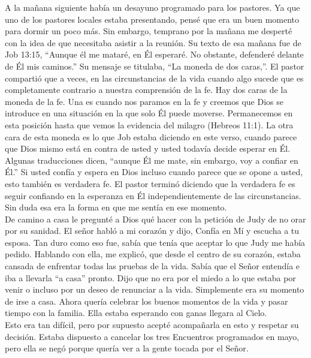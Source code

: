 \documentclass[twoside, 12pt]{book}
\begin{document}
A la mañana siguiente había un desayuno programado para los pastores. Ya que uno de los pastores locales estaba presentando, pensé que era un buen momento para dormir un poco más. Sin embargo, temprano por la mañana me desperté con la idea de que necesitaba asistir a la reunión. Su texto de esa mañana fue de Job 13:15, “Aunque él me mataré, en Él esperaré.  No obstante, defenderé delante de Él mis caminos.” Su mensaje se titulaba, “La moneda de dos caras,”. El pastor compartió que a veces, en las circunstancias de la vida cuando algo sucede que es completamente contrario a nuestra comprensión de la fe. Hay dos caras de la moneda de la fe. Una es cuando nos paramos en la fe y creemos que Dios se introduce en una situación en la que solo Él puede moverse. Permanecemos en esta posición hasta que vemos la evidencia del milagro (Hebreos 11:1). La otra cara de esta moneda es lo que Job estaba diciendo en este verso, cuando parece que Dios mismo está en contra de usted y usted todavía decide esperar en Él. Algunas traducciones dicen, “aunque Él me mate, sin embargo, voy a confiar en Él.” Si usted confía y espera en Dios incluso cuando parece que se opone a usted, esto también es verdadera fe. El pastor terminó diciendo que la verdadera fe es seguir confiando en la esperanza en Él independientemente de las circunstancias. Sin duda esa era la forma en que me sentía en ese momento.\\
 
De camino a casa le pregunté a Dios qué hacer con la petición de Judy de no orar por su sanidad. El señor habló a mi corazón y dijo, Confía en Mí y escucha a tu esposa. Tan duro como eso fue, sabía que tenía que aceptar lo que Judy me había pedido. Hablando con ella, me explicó, que desde el centro de su corazón, estaba cansada de enfrentar todas las pruebas de la vida. Sabía que el Señor entendía e iba a llevarla “a casa” pronto. Dijo que no era por el miedo a lo que estaba por venir o incluso por un deseo de renunciar a la vida. Simplemente era su momento de irse a casa. Ahora quería celebrar los buenos momentos de la vida y pasar tiempo con la familia. Ella estaba esperando con ganas llegara al Cielo.\\
 
Esto era tan difícil, pero por supuesto acepté acompañarla en esto y respetar su decisión. Estaba dispuesto a cancelar los tres Encuentros programados en mayo, pero ella se negó porque quería ver a la gente tocada por el Señor.\\
 
\end{document}
